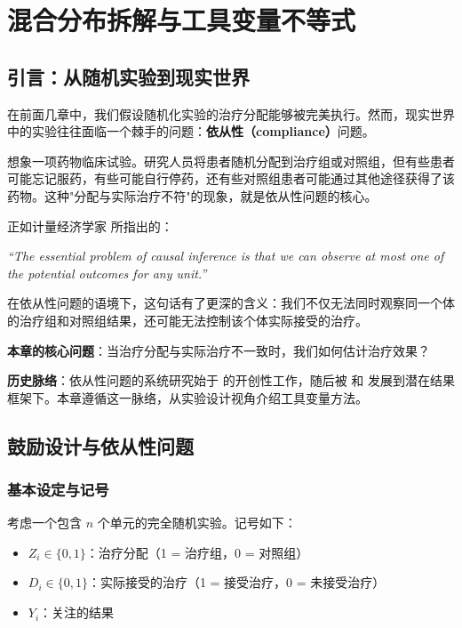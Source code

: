 
\chapter{混合分布拆解与工具变量不等式}\label{ch:22}

\section{引言：从随机实验到现实世界}\label{sec:22-intro}

在前面几章中，我们假设随机化实验的治疗分配能够被完美执行。然而，现实世界中的实验往往面临一个棘手的问题：\textbf{依从性（compliance）}问题。

想象一项药物临床试验。研究人员将患者随机分配到治疗组或对照组，但有些患者可能忘记服药，有些可能自行停药，还有些对照组患者可能通过其他途径获得了该药物。这种"分配与实际治疗不符"的现象，就是依从性问题的核心。

正如计量经济学家 \citet{AngristImbensRubin:1996} 所指出的：

\textit{``The essential problem of causal inference is that we can observe at most one of the potential outcomes for any unit.''}

在依从性问题的语境下，这句话有了更深的含义：我们不仅无法同时观察同一个体的治疗组和对照组结果，还可能无法控制该个体实际接受的治疗。

\textbf{本章的核心问题}：当治疗分配与实际治疗不一致时，我们如何估计治疗效果？

\textbf{历史脉络}：依从性问题的系统研究始于 \citet{Zelen:1979} 的开创性工作，随后被 \citet{ImbensAngrist:1994} 和 \citet{AngristImbensRubin:1996} 发展到潜在结果框架下。本章遵循这一脉络，从实验设计视角介绍工具变量方法。

\section{鼓励设计与依从性问题}\label{sec:22-encouragement-design}

\subsection{基本设定与记号}

考虑一个包含 $n$ 个单元的完全随机实验。记号如下：

\begin{itemize}
  \item $Z_i \in \{0, 1\}$：治疗分配（1 = 治疗组，0 = 对照组）
  \item $D_i \in \{0, 1\}$：实际接受的治疗（1 = 接受治疗，0 = 未接受治疗）
  \item $Y_i$：关注的结果
\end{itemize}

